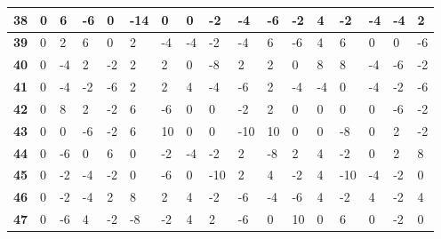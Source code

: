 \begin{longtable}[c]{|l|l|l|l|l|l|l|l|l|l|l|l|l|l|l|l|l|}
\textbf{38} & 0          & 6          & -6         & 0          & -14        & 0          & 0          & -2         & -4         & -6         & -2          & 4            & -2          & -4          & -4          & 2            \\ \hline
\textbf{39} & 0          & 2          & 6          & 0          & 2          & -4         & -4         & -2         & -4         & 6          & -6          & 4            & 6           & 0           & 0           & -6           \\ \hline
\textbf{40} & 0          & -4         & 2          & -2         & 2          & 2          & 0          & -8         & 2          & 2          & 0           & 8            & 8           & -4          & -6          & -2           \\ \hline
\textbf{41} & 0          & -4         & -2         & -6         & 2          & 2          & 4          & -4         & -6         & 2          & -4          & -4           & 0           & -4          & -2          & -6           \\ \hline
\textbf{42} & 0          & 8          & 2          & -2         & 6          & -6         & 0          & 0          & -2         & 2          & 0           & 0            & 0           & 0           & -6          & -2           \\ \hline
\textbf{43} & 0          & 0          & -6         & -2         & 6          & 10         & 0          & 0          & -10        & 10         & 0           & 0            & -8          & 0           & 2           & -2           \\ \hline
\textbf{44} & 0          & -6         & 0          & 6          & 0          & -2         & -4         & -2         & 2          & -8         & 2           & 4            & -2          & 0           & 2           & 8            \\ \hline
\textbf{45} & 0          & -2         & -4         & -2         & 0          & -6         & 0          & -10        & 2          & 4          & -2          & 4            & -10         & -4          & -2          & 0            \\ \hline
\textbf{46} & 0          & -2         & -4         & 2          & 8          & 2          & 4          & -2         & -6         & -4         & -6          & 4            & -2          & 4           & -2          & 4            \\ \hline
\textbf{47} & 0          & -6         & 4          & -2         & -8         & -2         & 4          & 2          & -6         & 0          & 10          & 0            & 6           & 0           & -2          & 0            \\ \hline

\end{longtable}
